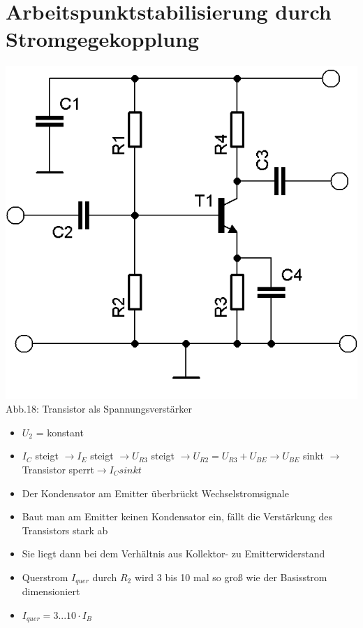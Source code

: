 \section*{Arbeitspunktstabilisierung durch Stromgegekopplung}
\begin{frame}
	\begin{center}
		\includegraphics[scale=1.2]{a06/Transistor-Verstaerker-APstab1.png}\\
		Abb.18: Transistor als Spannungsverstärker \cite{bnetza}
	\end{center}
	\begin{itemize}
		\item	$U_2$ = konstant
		\item	$I_C$ steigt $\rightarrow I_E$ steigt $\rightarrow U_{R3}$ steigt $\rightarrow U_{R2} = U_{R3} + U_{BE} \rightarrow U_{BE}$ sinkt $\rightarrow $Transistor sperrt$ \rightarrow I_C sinkt$
	\end{itemize}
\end{frame}

\begin{frame}
	\begin{itemize}
		\item	Der Kondensator am Emitter überbrückt Wechselstromsignale
		\item	Baut man am Emitter keinen Kondensator ein, fällt die Verstärkung des Transistors stark ab
		\item	Sie liegt dann bei dem Verhältnis aus Kollektor- zu Emitterwiderstand
		\item	Querstrom $I_{quer}$ durch $R_2$ wird 3 bis 10 mal so groß wie der Basisstrom dimensioniert
		\item	$I_{quer} = 3 ... 10 \cdot I_B$
	\end{itemize}
\end{frame}

